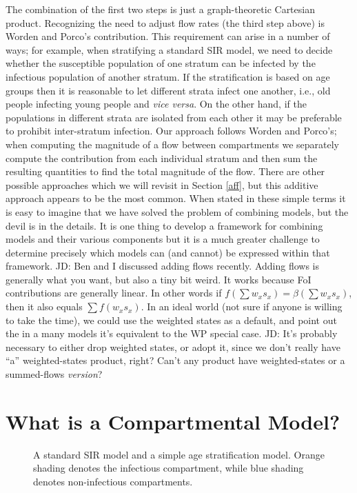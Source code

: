 \documentclass[pdflatex,sn-basic]{sn-jnl}%
\theoremstyle{definition}
\newcommand{\jd}[1]{{\color{blue} JD: #1}}
\newcommand{\vv}{{\emph{vice versa}\xspace}}
\begin{document}
The combination of the first two steps is just a graph-theoretic Cartesian product. Recognizing the need to adjust flow rates (the third step above) is Worden and Porco's contribution. This requirement can arise in a number of ways; for example, when stratifying a standard SIR model, we need to decide whether the susceptible population of one stratum can be infected by the infectious population of another stratum.
If the stratification is based on age groups then it is reasonable to let different strata infect one another, i.e., old people infecting young people and \vv. On the other hand, if the populations in different strata are isolated from each other it may be preferable to prohibit inter-stratum infection. Our approach follows Worden and Porco's; when computing the magnitude of a flow between compartments we separately compute the contribution from each individual stratum and then sum the resulting quantities to find the total magnitude of the flow. There are other possible approaches which we will revisit in Section \ref{aff}, but this additive approach appears to be the most common. When stated in these simple terms it is easy to imagine that we have solved the problem of combining models, but the devil is in the details. It is one thing to develop a framework for combining models and their various components but it is a much greater challenge to determine precisely which models can (and cannot) be expressed within that framework. 
\jd{Ben and I discussed adding flows recently. Adding flows is generally what you want, but also a tiny bit weird. It works because FoI contributions are generally linear. In other words if $f(\sum w_x s_x) = \beta(\sum w_x s_x)$, then it also equals $\sum f(w_x s_x)$. In an ideal world (not sure if anyone is willing to take the time), we could use the weighted states as a default, and point out the in a many models it's equivalent to the WP special case.}
\jd{It's probably necessary to either drop weighted states, or adopt it, since we don't really have “a” weighted-states product, right? Can't any product have weighted-states or a summed-flows \emph{version}?}



\section{What is a Compartmental Model?}\label{dcm}

\FloatBarrier
\begin{figure}
    \centering
    
    \caption{A standard SIR model and a simple age stratification model. Orange shading denotes the infectious compartment, while blue shading denotes non-infectious compartments.}
    \label{fig:sir_age_strat}
\end{figure}
\end{document}
